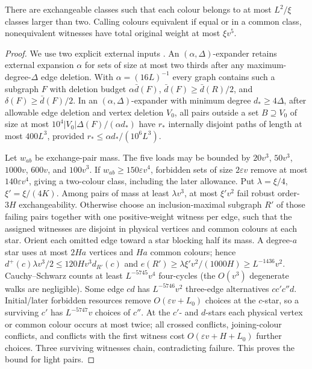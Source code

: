 \begin{lemma}\label{ent:classes}
There are exchangeable classes such that each colour belongs to at
most $L^2/\xi$ classes larger than two. Calling colours equivalent if equal or in a common class, nonequivalent witnesses have total
original weight at most $\xi{}v^5$.
\end{lemma}
\begin{proof}
We use two explicit external inputs \cite[Theorem 3.17, Lemma 3.22]{Montgomery}.
An $(\alpha,\Delta)$-expander retains external expansion $\alpha$ for sets of size at most two thirds after any maximum-degree-$\Delta$ edge deletion. With $\alpha=(16L)^{-1}$ every graph contains such a subgraph $F$ with deletion budget $\alpha\bar{d}(F)$, $\bar{d}(F)\ge\bar{d}(R)/2$, and $\delta(F)\ge\bar{d}(F)/2$. In an $(\alpha,\Delta)$-expander with minimum degree $d_*\ge4\Delta$, after allowable edge deletion and vertex deletion $V_0$, all pairs outside a set $B\supseteq{}V_0$ of size at most $10^4|V_0|\Delta(F)/(\alpha{}d_*)$ have $r_*$ internally disjoint paths of length at most $400L^3$, provided $r_*\le\alpha{}d_*/(10^6L^3)$.

Let $w_{ab}$ be exchange-pair mass. The five loads may be bounded by $20v^3$, $50v^3$, $1000v$, $600v$, and $100v^3$. If $w_{ab}\ge150\varepsilon{}v^4$, forbidden sets of size $2\varepsilon{}v$ remove at most $140\varepsilon{}v^4$, giving a two-colour class, including the later allowance.
Put $\lambda=\xi/4$, $\xi'=\xi/(4K)$. Among pairs of mass at least $\lambda{}v^3$, at most $\xi'v^2$ fail robust order-$3H$ exchangeability. Otherwise choose an inclusion-maximal subgraph $R'$ of those failing pairs together with one positive-weight witness per edge,
such that the assigned witnesses are disjoint in physical vertices
and common colours at each star. Orient each omitted edge toward
a star blocking half its mass. A degree-$a$ star uses at most $2Ha$ vertices and $Ha$ common colours; hence $d^+(c)\lambda{}v^3/2\le120Hv^3d_{R'}(c)$ and $e(R')\ge\lambda\xi'v^2/(1000H)\ge{}L^{-1436}v^2$. Cauchy--Schwarz counts at least $L^{-5745}v^4$ four-cycles
(the $O(v^3)$ degenerate walks are negligible). Some edge $cd$ has $L^{-5746}v^2$ three-edge alternatives $cc'c''d$. Initial/later forbidden resources remove $O(\varepsilon{}v+L_0)$ choices at the $c$-star, so a surviving $c'$ has $L^{-5747}v$ choices of $c''$. At the $c'$- and $d$-stars each physical vertex or common colour occurs at most twice; all crossed conflicts,
joining-colour conflicts, and conflicts with the first witness cost $O(\varepsilon{}v+H+L_0)$ further choices. Three surviving witnesses chain, contradicting failure. This proves the bound for light pairs.


\end{proof}
